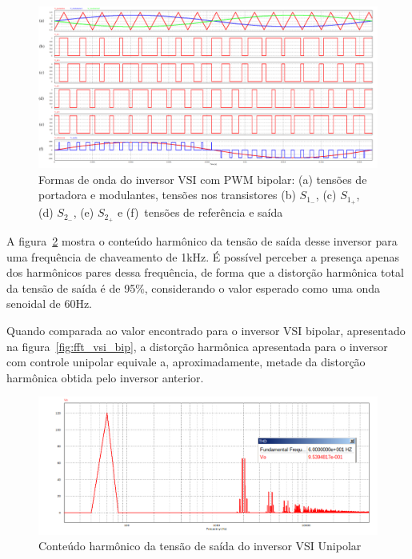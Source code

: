 \documentclass[
	12pt,				%
	openright,			%
	twoside,			%
	a4paper,			%
	english,			%
	french,				%
	spanish,			%
	brazil,				%
	]{abntex2}
\begin{document}
\begin{figure}[htbp]%
	\captionsetup{justification=centering}
	\centering%
		\includegraphics[width= \linewidth]{vsi_uni_func}
		\caption{Formas de onda do inversor VSI com PWM bipolar: (a) tensões de portadora e modulantes, tensões nos transistores (b) $S_{1_-}$, (c) $S_{1_+}$, (d) $S_{2_-}$, (e) $S_{2_+}$ e (f)~tensões de referência e saída}
		\label{fig:vsi_uni_func_graph}
\end{figure}

A figura~\ref{fig:fft_vsi_unip} mostra o conteúdo harmônico da tensão de saída desse inversor para uma frequência de chaveamento de 1kHz. É possível perceber a presença apenas dos harmônicos pares dessa frequência, de forma que a distorção harmônica total da tensão de saída é de 95\%, considerando o valor esperado como uma onda senoidal de 60Hz. 

Quando comparada ao valor encontrado para o inversor VSI bipolar, apresentado na figura~\ref{fig:fft_vsi_bip}, a distorção harmônica apresentada para o inversor com controle unipolar equivale a, aproximadamente, metade da distorção harmônica obtida pelo inversor anterior. 

\begin{figure}[H]%
	\centering%
		\includegraphics[width= \linewidth]{fft_vsi_uni}
		\caption{Conteúdo harmônico da tensão de saída do inversor VSI Unipolar}
		\label{fig:fft_vsi_unip}
\end{figure}
\end{document}
